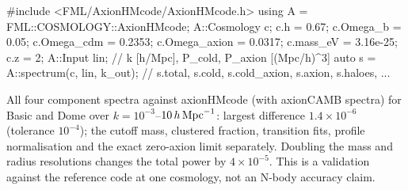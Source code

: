 \begin{cppcode}
#include <FML/AxionHMcode/AxionHMcode.h>
using A = FML::COSMOLOGY::AxionHMcode;
A::Cosmology c;  c.h = 0.67;  c.Omega_b = 0.05;  c.Omega_cdm = 0.2353;
c.Omega_axion = 0.0317;  c.mass_eV = 3.16e-25;  c.z = 2;
A::Input lin;                                 // k [h/Mpc], P_cold, P_axion [(Mpc/h)^3]
auto s = A::spectrum(c, lin, k_out);          // s.total, s.cold, s.cold_axion, s.axion, s.haloes, ...
\end{cppcode}

\begin{validation}
All four component spectra against axionHMcode (with axionCAMB spectra) for Basic and Dome over $k=10^{-3}$--$10\,h\,\mathrm{Mpc}^{-1}$:
largest difference $1.4\times10^{-6}$ (tolerance $10^{-4}$); the cutoff mass, clustered fraction, transition fits,
profile normalisation and the exact zero-axion limit separately. Doubling the mass and radius resolutions changes the total
power by $4\times10^{-5}$. This is a validation against the reference code at one cosmology, not an N-body accuracy claim.
\end{validation}
